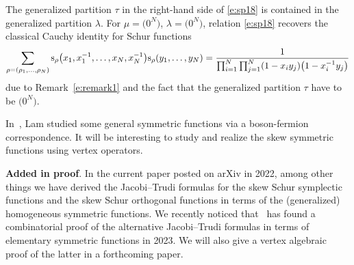 \documentclass[10pt,a4paper]{amsart}
\numberwithin{equation}{section}
\begin{document}
\begin{Remark} The generalized partition $\tau$ in the right-hand side of \eqref{e:sp18} is contained in the generalized partition $\lambda$. For $\mu=\big(0^N\big)$, $\lambda=\big(0^N\big)$, relation \eqref{e:sp18} recovers the classical Cauchy identity for Schur functions
\begin{align*}
\sum_{\rho=(\rho_1,\dots,\rho_{N}) }{\rm s}_{\rho}\big(x_1,x^{-1}_1,\dots,x_N,x^{-1}_N\big){\rm s}_{\rho}(y_1,\dots,y_N)
=\frac{1}{\prod^N_{i=1}\prod^N_{j=1}(1-x_iy_j)\big(1-x^{-1}_iy_j\big)}
\end{align*}
due to Remark~\ref{e:remark1} and the fact that the generalized partition $\tau$ have to be $\big(0^N\big)$.
\end{Remark}
\begin{Remark}

In~\cite{Lam2006}, Lam studied some general symmetric functions via a boson-fermion correspondence. It will be interesting to study and realize the
skew symmetric functions using vertex operators.
\end{Remark}

{\bf Added in proof}. In the current paper posted on arXiv in 2022, among other things we have derived the Jacobi--Trudi formulas for the skew Schur symplectic functions and the skew Schur orthogonal functions in terms of the
(generalized) homogeneous symmetric functions. We recently noticed that~\cite{AFHS} has found a combinatorial proof of the alternative Jacobi--Trudi formulas in terms of elementary symmetric functions in 2023.
We will also give a vertex algebraic proof of the
latter in a forthcoming paper.

\appendix
\end{document}

